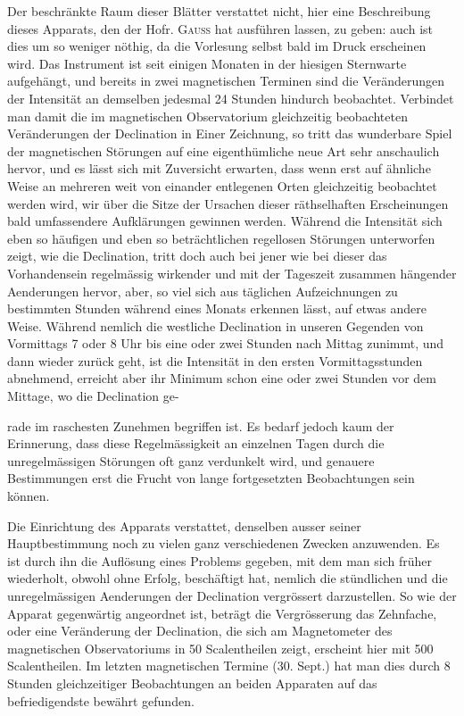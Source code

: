 Der beschränkte Raum dieser Blätter verstattet nicht, hier eine Beschreibung dieses Apparats, den der Hofr. \textsc{Gauss} hat ausführen lassen, zu geben: auch ist dies um so weniger nöthig, da die Vorlesung selbst bald im Druck erscheinen wird. Das Instrument ist seit einigen Monaten in der hiesigen Sternwarte aufgehängt, und bereits in zwei magnetischen Terminen sind die Veränderungen der Intensität an demselben jedesmal 24 Stunden hindurch beobachtet. Verbindet man damit die im magnetischen Observatorium gleichzeitig beobachteten Veränderungen der Declination in Einer Zeichnung, so tritt das wunderbare Spiel der magnetischen Störungen auf eine eigenthümliche neue Art sehr anschaulich hervor, und es lässt sich mit Zuversicht erwarten, dass wenn erst auf ähnliche Weise an mehreren weit von einander entlegenen Orten gleichzeitig beobachtet werden wird, wir über die Sitze der Ursachen dieser räthselhaften Erscheinungen bald umfassendere Aufklärungen gewinnen werden. Während die Intensität sich eben so häufigen und eben so beträchtlichen regellosen Störungen unterworfen zeigt, wie die Declination, tritt doch auch bei jener wie bei dieser das Vorhandensein regelmässig wirkender und mit der Tageszeit zusammen hängender Aenderungen hervor, aber, so viel sich aus täglichen Aufzeichnungen zu bestimmten Stunden während eines Monats erkennen lässt, auf etwas andere Weise. Während nemlich die westliche Declination in unseren Gegenden von Vormittags 7 oder 8 Uhr bis eine oder zwei Stunden nach Mittag zunimmt, und dann wieder zurück geht, ist die Intensität in den ersten Vormittagsstunden abnehmend, erreicht aber ihr Minimum schon eine oder zwei Stunden vor dem Mittage, wo die Declination ge-\par{}
\par\clearpage
{}
\noindent rade im raschesten Zunehmen begriffen ist. Es bedarf jedoch kaum der Erinnerung, dass diese Regelmässigkeit an einzelnen Tagen durch die unregelmässigen Störungen oft ganz verdunkelt wird, und genauere Bestimmungen erst die Frucht von lange fortgesetzten Beobachtungen sein können.

Die Einrichtung des Apparats verstattet, denselben ausser seiner Hauptbestimmung noch zu vielen ganz verschiedenen Zwecken anzuwenden. Es ist durch ihn die Auflösung eines Problems gegeben, mit dem man sich früher wiederholt, obwohl ohne Erfolg, beschäftigt hat, nemlich die stündlichen und die unregelmässigen Aenderungen der Declination vergrössert darzustellen. So wie der Apparat gegenwärtig angeordnet ist, beträgt die Vergrösserung das Zehnfache, oder eine Veränderung der Declination, die sich am Magnetometer des magnetischen Observatoriums in 50 Scalentheilen zeigt, erscheint hier mit 500 Scalentheilen. Im letzten magnetischen Termine (30. Sept.) hat man dies durch 8 Stunden gleichzeitiger Beobachtungen an beiden Apparaten auf das befriedigendste bewährt gefunden.

